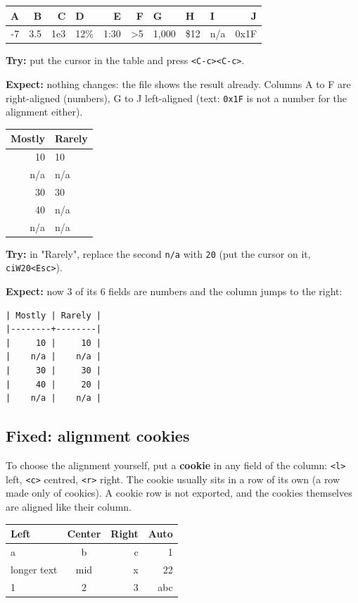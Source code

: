 \begin{table}[htbp]
\label{tab:org817e9dd}
\centering
\begin{tabular}{rrrlrrlllr}
A & B & C & D & E & F & G & H & I & J\\
\hline
-7 & 3.5 & 1e3 & 12\% & 1:30 & >5 & 1,000 & \$12 & n/a & 0x1F\\
\end{tabular}
\end{table}

\textbf{Try:} put the cursor in the table and press \texttt{<C-c><C-c>}.

\textbf{Expect:} nothing changes: the file shows the result already. Columns A to
F are right-aligned (numbers), G to J left-aligned (text: \texttt{0x1F} is not a
number for the alignment either).

\begin{table}[htbp]
\label{tab:org74913ca}
\centering
\begin{tabular}{rl}
Mostly & Rarely\\
\hline
10 & 10\\
n/a & n/a\\
30 & 30\\
40 & n/a\\
n/a & n/a\\
\end{tabular}
\end{table}

\textbf{Try:} in "Rarely", replace the second \texttt{n/a} with \texttt{20} (put the cursor on
it, \texttt{ciW20<Esc>}).

\textbf{Expect:} now 3 of its 6 fields are numbers and the column jumps to the
right:
\begin{verbatim}
| Mostly | Rarely |
|--------+--------|
|     10 |     10 |
|    n/a |    n/a |
|     30 |     30 |
|     40 |     20 |
|    n/a |    n/a |
\end{verbatim}
\subsection{Fixed: alignment cookies}
\label{sec:org4fe12a3}
To choose the alignment yourself, put a \textbf{cookie} in any field of the column:
\texttt{<l>} left, \texttt{<c>} centred, \texttt{<r>} right. The cookie usually sits in a row of
its own (a row made only of cookies). A cookie row is not exported, and
the cookies themselves are aligned like their column.

\begin{table}[htbp]
\label{tab:org8581edd}
\centering
\begin{tabular}{lcrr}
Left & Center & Right & Auto\\
\hline
a & b & c & 1\\
longer text & mid & x & 22\\
1 & 2 & 3 & abc\\
\end{tabular}
\end{table}

